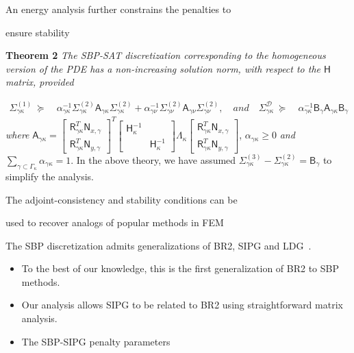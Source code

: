 \documentclass[final]{beamer}
\newlength{\secondcolwid}
\newcommand{\fnc}[1]{\ensuremath{\mathcal{#1}}}
\newcommand{\mat}[1]{\ensuremath{\mathsf{#1}}}
\renewcommand{\H}[0]{\mat{H}}
\newcommand{\Bg}[0]{\mat{B}_{\gamma}}
\newcommand{\Sig}[0]{\mat{\Sigma}}
\newcommand{\Lam}[0]{\mat{\Lambda}}
\newcommand{\Nxg}[0]{\mat{N}_{x,\gamma}}
\newcommand{\Nyg}[0]{\mat{N}_{y,\gamma}}
\newcommand{\Rgk}[0]{\mat{R}_{\gamma\kappa}}
\newcommand{\Siggk}[1]{\Sig_{\gamma\kappa}^{(#1)}}
\newcommand{\Siggn}[1]{\Sig_{\gamma\nu}   ^{(#1)}}
\begin{document}
\begin{frame}[t]
\begin{columns}[t]
\begin{column}{\secondcolwid}
\begin{alertblock}{An energy analysis further constrains the penalties to 
        
         ensure stability}
    \vskip 0.2in
    \textbf{Theorem 2} \label{thm:stability-condition}
    \textit{
        The SBP-SAT discretization corresponding to the homogeneous version
        of the PDE has a non-increasing solution norm, with respect to
        the $\H$ matrix, provided 
    }
       
    \begin{equation*} \label{stability_conditions}
    \begin{aligned}
    \Siggk{1} 
    \:\succeq\: & \alpha_{\gamma\kappa}^{-1}\Siggk{2} \mat{A}_{\gamma\kappa} \Siggk{2} 
    + \alpha_{\gamma\nu}^{-1}\Siggn{2} \mat{A}_{\gamma\nu}\Siggn{2}, \quad and \quad
    \Sig_{\gamma\kappa}^{\fnc{D}} \:\succeq\: & \alpha_{\gamma\kappa}^{-1}\Bg \mat{A}_{\gamma\kappa} \Bg 
    \end{aligned}
    \end{equation*}
    \normalfont
    \textit{where}
    \small 
    $\mat{A}_{\gamma\kappa} = \begin{bmatrix} \Rgk^T\Nxg  \\ \Rgk^T\Nyg  \end{bmatrix}^T
        \begin{bmatrix}
            \H^{-1}_{\kappa} & \\ & \H^{-1}_{\kappa}
        \end{bmatrix} \Lam_{\kappa} 
        \begin{bmatrix} \Rgk^T\Nxg  \\ \Rgk^T\Nyg  \end{bmatrix}$\normalfont,
    $\alpha_{\gamma\kappa} \ge 0$ \textit{and} $\sum_{\gamma \subset \Gamma_{\kappa}} \alpha_{\gamma\kappa} = 1$.
    \vskip 0.2in
    In the above theory, we have assumed $\Siggk{3} -\Siggk{2}=\Bg$ \normalfont to simplify the analysis.
\end{alertblock}
\vskip-0.6cm
\begin{alertblock}{The adjoint-consistency and stability conditions can be
        
        used to recover analogs of popular methods in FEM}
    The SBP discretization admits generalizations of BR2, SIPG and LDG~\cite{Arnold2002}. 
    \begin{itemize}
        \setlength{\itemindent}{0.0em}
        \item To the best of our knowledge, this is the first generalization of BR2 to SBP methods.
        \item Our analysis allows SIPG to be related to BR2 using straightforward matrix analysis.
        \item The SBP-SIPG penalty parameters

\end{itemize}
\end{alertblock}
\end{column}
\end{columns}
\end{frame}
\end{document}
